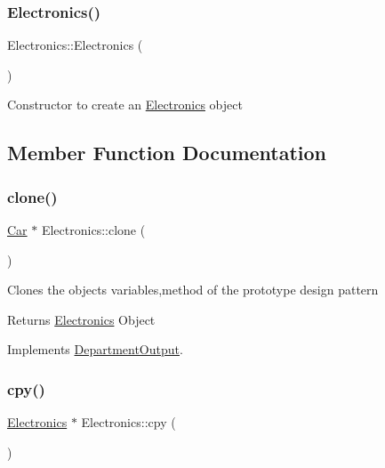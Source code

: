 \subsubsection{\texorpdfstring{Electronics()}{Electronics()}}
{\footnotesize\ttfamily Electronics\+::\+Electronics (\begin{DoxyParamCaption}{ }\end{DoxyParamCaption})}

Constructor to create an \hyperlink{classElectronics}{Electronics} object 

\subsection{Member Function Documentation}
\mbox{\label{classElectronics_a292164aedff12771f4f05af648a9fc70}} 
\subsubsection{\texorpdfstring{clone()}{clone()}}
{\footnotesize\ttfamily \hyperlink{classCar}{Car} $\ast$ Electronics\+::clone (\begin{DoxyParamCaption}{ }\end{DoxyParamCaption})\hspace{0.3cm}{\ttfamily [virtual]}}

Clones the objects variables,method of the prototype design pattern \begin{DoxyReturn}{Returns}
\hyperlink{classElectronics}{Electronics} Object 
\end{DoxyReturn}


Implements \hyperlink{classDepartmentOutput_ab20c9d559bca6ce8e6748dfac47c3f84}{Department\+Output}.

\mbox{\label{classElectronics_a156b51c0a1a7f2850e33dbc6879b9c1e}} 
\subsubsection{\texorpdfstring{cpy()}{cpy()}}
{\footnotesize\ttfamily \hyperlink{classElectronics}{Electronics} $\ast$ Electronics\+::cpy (\begin{DoxyParamCaption}{ }\end{DoxyParamCaption})}

